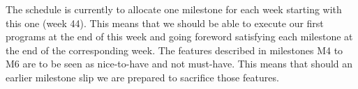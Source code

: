 \documentclass[onside,10pt,left=1cm]{article}
\begin{document}
The schedule is currently to allocate one milestone for each week
starting with this one (week 44). This means that we should be able to
execute our first programs at the end of this week and going foreword
satisfying each milestone at the end of the corresponding week. The
features described in milestones M4 to M6 are to be seen as
nice-to-have and not must-have. This means that should an earlier
milestone slip we are prepared to sacrifice those features.
\end{document}
